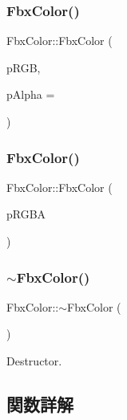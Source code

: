 \subsubsection{\texorpdfstring{Fbx\+Color()}{FbxColor()}\hspace{0.1cm}{\footnotesize\ttfamily [3/4]}}
{\footnotesize\ttfamily Fbx\+Color\+::\+Fbx\+Color (\begin{DoxyParamCaption}\item[{const \hyperlink{fbxtypes_8h_ae0a96f14cde566774c7553aa7523b7a7}{Fbx\+Double3} \&}]{p\+R\+GB,  }\item[{const double}]{p\+Alpha = {} }\end{DoxyParamCaption})}

\mbox{\label{class_fbx_color_a845eb670fb29e7a942973c4281c4939e}} 
\subsubsection{\texorpdfstring{Fbx\+Color()}{FbxColor()}\hspace{0.1cm}{\footnotesize\ttfamily [4/4]}}
{\footnotesize\ttfamily Fbx\+Color\+::\+Fbx\+Color (\begin{DoxyParamCaption}\item[{const \hyperlink{fbxtypes_8h_a03dddc7979e0016f74a095b1943d97a3}{Fbx\+Double4} \&}]{p\+R\+G\+BA }\end{DoxyParamCaption})}

\mbox{\label{class_fbx_color_a5b8800e1233bdc6eb44add9be6cab9df}} 
\subsubsection{\texorpdfstring{$\sim$\+Fbx\+Color()}{~FbxColor()}}
{\footnotesize\ttfamily Fbx\+Color\+::$\sim$\+Fbx\+Color (\begin{DoxyParamCaption}{ }\end{DoxyParamCaption})}



Destructor. 



\subsection{関数詳解}
\mbox{\label{class_fbx_color_a12d5438931a4401d632612dc3564c433}} 
